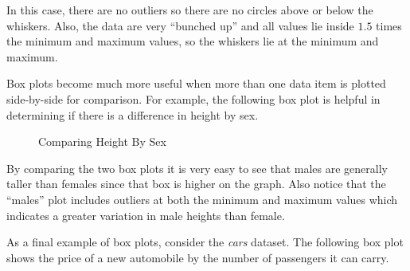 In this case, there are no outliers so there are no circles above or below the whiskers. Also, the data are very ``bunched up'' and all values lie inside $ 1.5 $ times the minimum and maximum values, so the whiskers lie at the minimum and maximum.

Box plots become much more useful when more than one data item is plotted side-by-side for comparison. For example, the following box plot is helpful in determining if there is a difference in height by sex.

\begin{figure}[H]
  \begin{center}
    \caption{Comparing Height By Sex}
  \end{center}
\end{figure}

By comparing the two box plots it is very easy to see that males are generally taller than females since that box is higher on the graph. Also notice that the ``males'' plot includes outliers at both the minimum and maximum values which indicates a greater variation in male heights than female.

As a final example of box plots, consider the \textit{cars} dataset. The following box plot shows the price of a new automobile by the number of passengers it can carry.

